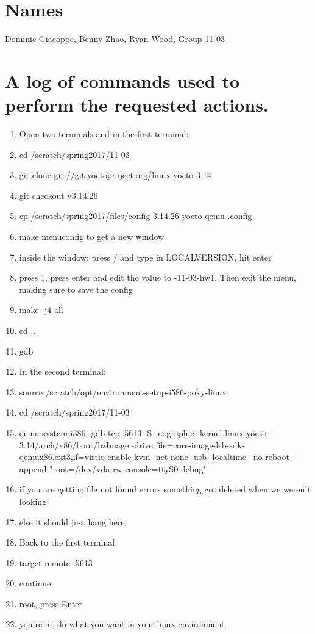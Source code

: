 \documentclass[IEEEtran,letterpaper,10pt,notitlepage,draftclsnofoot,onecolumn]{article}
\begin{document}
\section{Names} 
Dominic Giacoppe, Benny Zhao, Ryan Wood, Group 11-03
\section{A log of commands used to perform the requested actions.}
\begin{enumerate}
\item Open two terminals and in the first terminal:
\item cd /scratch/spring2017/11-03
\item git clone git://git.yoctoproject.org/linux-yocto-3.14
\item git checkout v3.14.26
\item cp /scratch/spring2017/files/config-3.14.26-yocto-qemu .config
\item make menuconfig to get a new window
\item inside the window: press / and type in LOCALVERSION, hit enter
\item press 1, press enter and edit the value to -11-03-hw1. Then exit the menu, making sure to save the config
\item make -j4 all
\item cd .. 
\item gdb
\item In the second terminal:
\item source /scratch/opt/environment-setup-i586-poky-linux
\item cd /scratch/spring2017/11-03
\sloppy
\item qemu-system-i386 -gdb tcp::5613 -S -nographic -kernel linux-yocto-3.14/arch/x86/boot/bzImage  -drive file=core-image-lsb-sdk-qemux86.ext3,if=virtio-enable-kvm -net none -usb -localtime --no-reboot --append "root=/dev/vda rw console=ttyS0 debug"
\item if you are getting file not found errors something got deleted when we weren't looking
\item else it should just hang here
\item Back to the first terminal
\item target remote :5613
\item continue
\item root, press Enter
\item you're in, do what you want in your linux environment.
\end{enumerate} 
\end{document}
